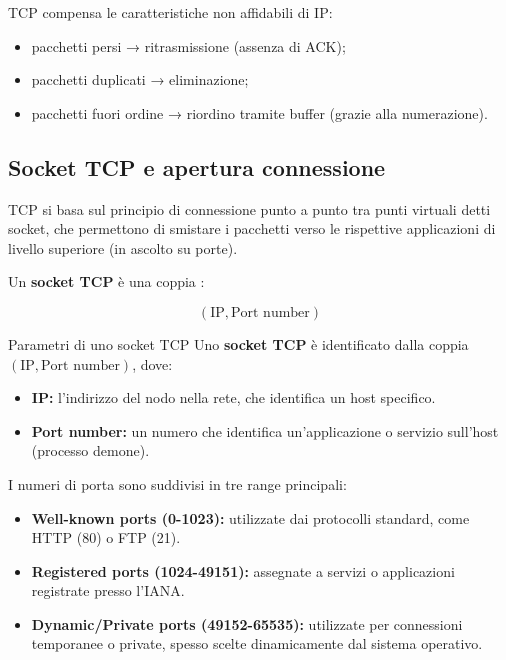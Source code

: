 \documentclass[a4paper,12pt]{report}
\begin{document}
TCP compensa le caratteristiche non affidabili di IP:

\begin{itemize}
    \item pacchetti persi → ritrasmissione (assenza di ACK);
    \item pacchetti duplicati → eliminazione;
    \item pacchetti fuori ordine → riordino tramite buffer (grazie alla numerazione).
\end{itemize}
\newpage
\subsection{Socket TCP e apertura connessione}
TCP si basa sul principio di connessione punto a punto tra punti virtuali detti socket, che permettono di smistare i pacchetti 
verso le rispettive applicazioni di livello superiore (in ascolto su porte). 

Un \textbf{socket TCP} è una coppia :

\[
(\text{IP}, \text{Port number})
\]

\begin{defbox}{Parametri di uno socket TCP}
Uno \textbf{socket TCP} è identificato dalla coppia $(\text{IP}, \text{Port number})$, dove:

\begin{itemize}
    \item \textbf{IP:} l'indirizzo del nodo nella rete, che identifica un host specifico.
    \item \textbf{Port number:} un numero che identifica un'applicazione o servizio sull'host (processo demone).
\end{itemize}

I numeri di porta sono suddivisi in tre range principali:

\begin{itemize}
    \item \textbf{Well-known ports (0-1023):} utilizzate dai protocolli standard, come HTTP (80) o FTP (21).
    \item \textbf{Registered ports (1024-49151):} assegnate a servizi o applicazioni registrate presso l'IANA.
    \item \textbf{Dynamic/Private ports (49152-65535):} utilizzate per connessioni temporanee o private, spesso scelte dinamicamente dal sistema operativo.
\end{itemize}
\end{defbox}
\end{document}
